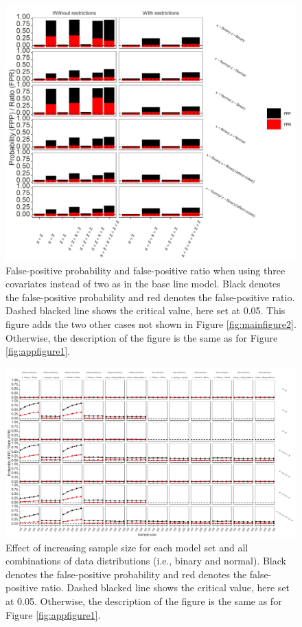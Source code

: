 \begin{figure}[ht!]
\includegraphics[width=1\textwidth]{R/Analysis/Result/Figures/Figure1CSI.jpeg}
\centering
\caption{False-positive probability and false-positive ratio when using three covariates instead of two as in the base line model. Black denotes the false-positive probability and red denotes the false-positive ratio. Dashed blacked line shows the critical value, here set at 0.05. This figure adds the two other cases not shown in Figure \ref{fig:mainfigure2}. Otherwise, the description of the figure is the same as for Figure \ref{fig:appfigure1}.
}
\label{fig:appfigure5}
\end{figure}

\begin{landscape}
\begin{figure}[ht!]
\includegraphics[scale=0.75]{R/Analysis/Result/Figures/Figure1DSI.jpeg}
\centering
\caption{Effect of increasing sample size for each model set and all combinations of data distributions (i.e., binary and normal). Black denotes the false-positive probability and red denotes the false-positive ratio. Dashed blacked line shows the critical value, here set at 0.05. Otherwise, the description of the figure is the same as for Figure \ref{fig:appfigure1}. 
}
\label{fig:appfigure6}
\end{figure}
\end{landscape}

